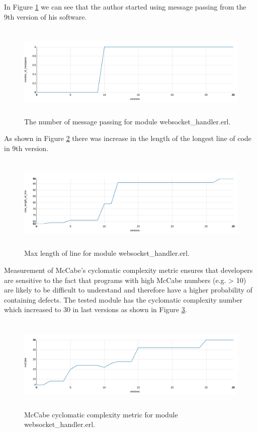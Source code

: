In Figure \ref{fig:chat} we can see that the author started using message passing from the 9th version of his software.

\begin{figure}[h]
	\centering
	\includegraphics[height=45mm]{figures/chat.png}
	\caption{The number of message passing for module websocket\_handler.erl.}
	\label{fig:chat}
\end{figure}

As shown in Figure \ref{fig:chat5} there was increase in the length of the longest line of code in 9th version. 
\begin{figure}[h]
	\centering
	\includegraphics[height=45mm]{figures/chat5.png}
	\caption{Max length of line for module websocket\_handler.erl.}
	\label{fig:chat5}
\end{figure}

Measurement of McCabe’s cyclomatic complexity metric ensures that developers are sensitive to the fact that programs with high McCabe numbers (e.g. > 10) are likely to be difficult to understand and therefore have a higher probability of containing defects. 
The tested module has the cyclomatic complexity number which increased to 30 in last versions as shown in Figure \ref{fig:mcCabe}.

\begin{figure}[h]
	\centering
	\includegraphics[height=45mm]{figures/mcCabe.png}
	\caption{
	McCabe cyclomatic complexity metric for module websocket\_handler.erl.}
	\label{fig:mcCabe}
\end{figure}

